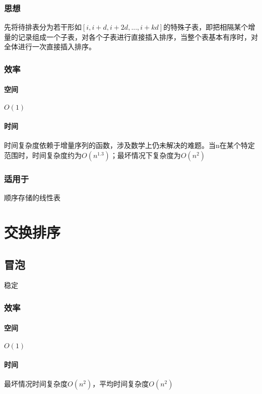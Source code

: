 \subsubsection{思想}
先将待排表分为若干形如\([i, i + d, i + 2d, ..., i + kd]\)的特殊子表，即把相隔某个增量的记录组成一个子表，对各个子表进行直接插入排序，当整个表基本有序时，对全体进行一次直接插入排序。

\subsubsection{效率}

\paragraph{空间}
\(O(1)\)

\paragraph{时间}
时间复杂度依赖于增量序列的函数，涉及数学上仍未解决的难题。当n在某个特定范围时，时间复杂度约为\(O(n^{1.3})\)；最坏情况下复杂度为\(O(n^2)\)


\subsubsection{适用于}
顺序存储的线性表


\section{交换排序}

\subsection{冒泡}
稳定

\subsubsection{效率}
\paragraph{空间}
\(O(1)\)

\paragraph{时间}

最坏情况时间复杂度\(O(n^2)\)，平均时间复杂度\(O(n^2)\)


